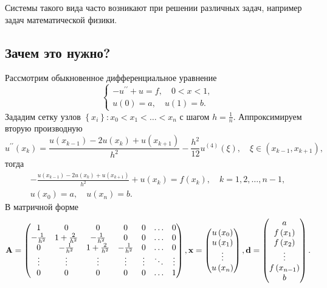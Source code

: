 \documentclass[12pt]{article}
\begin{document}
    Системы такого вида часто возникают при решении различных задач, например задач математической физики.
    
    \subsection*{Зачем это нужно?}
    
    Рассмотрим обыкновенное дифференциальное уравнение
    \begin{equation}
    	\left\{
    	\begin{matrix}
    			-u^{\prime\prime}+u=f,\quad 0<x<1,\\
    			u\left(0\right)=a, \quad u\left(1\right)=b.
    	\end{matrix}
    	\right.
    \end{equation}
    Зададим сетку узлов $\left\{x_i\right\} : x_0 < x_1 < \ldots < x_n$ с шагом $h=\frac{1}{n}$. Аппроксимируем вторую производную
    \begin{equation}
    	u^{\prime\prime}\left(x_k\right)= \frac{u\left(x_{k-1}\right)-2u\left(x_k\right)+u\left(x_{k+1}\right)}{h^2}-\frac{h^2}{12}u^{\left(4\right)}\left(\xi\right),\quad \xi\in\left(x_{k-1},x_{k+1}\right),
    \end{equation}
    тогда
    \begin{equation}
    	\begin{gathered}
    	-\frac{u\left(x_{k-1}\right)-2u\left(x_k\right)+u\left(x_{k+1}\right)}{h^2}+u\left(x_k\right)=f\left(x_k\right),\quad k=1,2,\ldots,n-1,\\ u\left(x_0\right)=a,\quad u\left(x_n\right)=b.
    	\end{gathered}
    \end{equation}
    В матричной форме
    \begin{equation}
    	\bold{A}=\begin{pmatrix}
    		1 & 0 & 0 & 0 & 0 & \ldots & 0 \\
    		-\frac{1}{h^2} & 1+\frac{2}{h^2} & -\frac{1}{h^2} & 0 & 0 & \ldots & 0 \\
    		0 & -\frac{1}{h^2} & 1+\frac{2}{h^2} & -\frac{1}{h^2} & 0 & \ldots & 0 \\
    		\vdots & \vdots & \vdots & \vdots & \vdots & \ddots & \vdots \\
    		0 & 0 & 0 & 0 & 0 & \ldots & 1
    	\end{pmatrix},
    	\bold{x}=\begin{pmatrix}
    		u\left(x_0\right) \\
    		u\left(x_1\right) \\
    		\vdots \\
    		u\left(x_n\right)
    	\end{pmatrix},
    	\bold{d}=\begin{pmatrix}
    		a \\
    		f\left(x_1\right) \\
    		f\left(x_2\right) \\
    		\vdots \\
    		f\left(x_{n-1}\right) \\
    		b
    	\end{pmatrix}.
    \end{equation}
\end{document}
